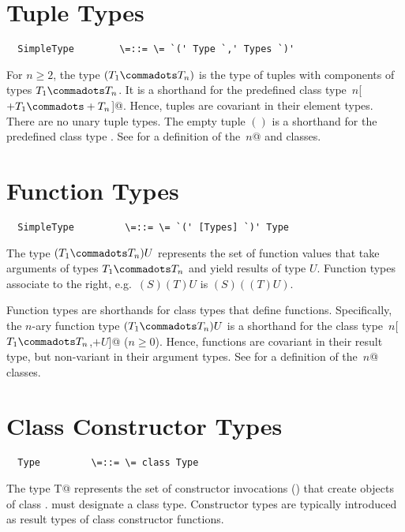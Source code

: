 \documentclass[11pt]{report}
\begin{document}
\section{Tuple Types}
\label{sec:tuple-types}

\syntax\begin{verbatim}
  SimpleType        \=::= \= `(' Type `,' Types `)'
\end{verbatim}

For $n \geq 2$, the type $(T_1 \commadots T_n)$ is the type of tuples
with components of types $T_1 \commadots T_n$.  It is a shorthand for
the predefined class type \verb@Tuple$\,n$[$+T_1 \commadots +T_n$]@.
Hence, tuples are covariant in their element types.  There are no
unary tuple types.  The empty tuple $()$ is a shorthand for the
predefined class type \verb@Unit@.  See  for a
definition of the \verb@Tuple$\,n$@ and \verb@Unit@ classes.

\section{Function Types}
\label{sec:function-types}

\syntax\begin{verbatim}
  SimpleType         \=::= \= `(' [Types] `)' Type
\end{verbatim}
The type $(T_1 \commadots T_n) U$ represents the set of function
values that take arguments of types $T_1 \commadots T_n$ and yield
results of type $U$.  Function types associate to the right,
e.g.\ $(S)(T)U$ is $(S)((T)U)$.

Function types are shorthands for class types that define
\verb@apply@ functions.  Specifically, the $n$-ary function type
$(T_1 \commadots T_n)U$ is a shorthand for the class type
\verb@Function$\,n$[$T_1 \commadots T_n$,$+U$]@ ($n \geq 0$). Hence,
functions are covariant in their result type, but non-variant in their
argument types. See
 for a definition of the \verb@Function$\,n$@ classes.

\section{Class Constructor Types}
\label{sec:constr-type}

\syntax\begin{verbatim}
  Type         \=::= \= class Type
\end{verbatim}

The type \verb@class T@ represents the set of constructor invocations
() that create objects of class \verb@T@. \verb@T@
must designate a class type.  Constructor types are typically
introduced as result types of class constructor functions.
\end{document}
